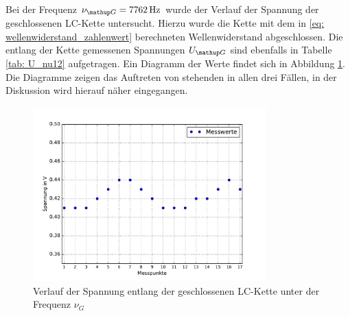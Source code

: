 Bei der Frequenz $\nu\ua{G} = \SI{7762}{\hertz}$ wurde der Verlauf der Spannung der geschlossenen LC-Kette untersucht. Hierzu wurde die Kette
mit dem in \eqref{eq: wellenwiderstand_zahlenwert} berechneten Wellenwiderstand abgeschlossen. Die entlang der Kette gemessenen
Spannungen $U\ua{G}$ sind ebenfalls in Tabelle \ref{tab: U_nu12} aufgetragen. Ein Diagramm der Werte findet sich in Abbildung \ref{fig: U_G}.
Die Diagramme zeigen das Auftreten von stehenden in allen drei Fällen, in der Diskussion wird hierauf näher eingegangen.
\begin{figure}
  \centering
  \includegraphics[width = 0.8\textwidth]{../Messdaten/plots/spannungsverlauf_geschlossen.pdf}
  \caption{Verlauf der Spannung entlang der geschlossenen LC-Kette unter der Frequenz $\nu_G$}
  \label{fig: U_G}
\end{figure}
